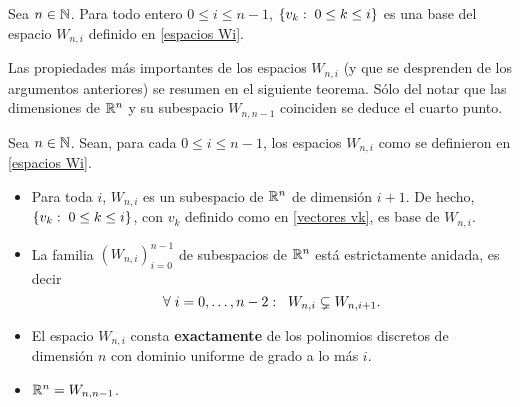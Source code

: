 \begin{cor}
Sea $n \in \mathbb{N}$. Para todo entero $0 \leq i \leq n-1$, 
$\{v_{k}: \hspace{0.1cm} 0\leq k \leq i \}$ es una base
del espacio $W_{n,i}$
definido en \eqref{espacios Wi}.
\end{cor}


Las propiedades más importantes de los
espacios $W_{n,i}$ (y que se desprenden
de los argumentos anteriores) se 
resumen en el siguiente teorema. 
Sólo del notar que las dimensiones de 
$\mathbb{R}^{n}$ y su subespacio $W_{n, n-1}$
coinciden se deduce el cuarto punto.


\begin{teo}
\label{cor: propiedades importantes de espacios Wi}
Sea $n \in \mathbb{N}$. Sean, para cada $0 \leq i \leq n-1$,
los espacios $W_{n,i}$ como
se definieron en \eqref{espacios Wi}.
\begin{itemize}
\item Para toda $i$, $W_{n,i}$ es un subespacio
de $\mathbb{R}^{n}$ de dimensión $i+1$. De hecho, 
$\{v_{k}: \hspace{0.1cm} 0\leq k \leq i \}$, con
$v_{k}$ definido como en \eqref{vectores vk},
es base de $W_{n,i}$.

\item La familia $(W_{n,i})_{i=0}^{n-1}$ de subespacios
	de $\mathbb{R}^{n}$ está estrictamente anidada, es decir
	\begin{equation}
	\label{espacios Wi estan anidados}
	\forall \hspace{0.1cm}
	i = 0, \ldots , n-2: \hspace{0.2cm}
	W_{n,i} \subsetneq W_{n,i+1}.
	\end{equation}

\item El espacio $W_{n,i}$ consta \textbf{exactamente}
de los polinomios discretos de dimensión $n$ con dominio uniforme
de grado a lo más $i$.

\item $\mathbb{R}^{n}= W_{n,n-1}$.
\end{itemize}
\end{teo}

